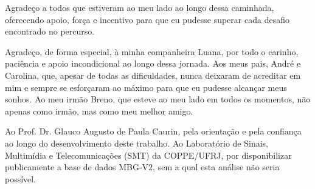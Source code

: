 \begin{agradecimentos}
Agradeço a todos que estiveram ao meu lado ao longo dessa caminhada, oferecendo apoio, força e incentivo para que eu pudesse superar cada desafio encontrado no percurso.

Agradeço, de forma especial, à minha companheira Luana, por todo o carinho, paciência e apoio incondicional ao longo dessa jornada. Aos meus pais, André e Carolina, que, apesar de todas as dificuldades, nunca deixaram de acreditar em mim e sempre se esforçaram ao máximo para que eu pudesse alcançar meus sonhos. Ao meu irmão Breno, que esteve ao meu lado em todos os momentos, não apenas como irmão, mas como meu melhor amigo.

Ao Prof. Dr. Glauco Augusto de Paula Caurin, pela orientação e pela confiança ao longo do desenvolvimento deste trabalho. Ao Laboratório de Sinais, Multimídia e Telecomunicações (SMT) da COPPE/UFRJ, por disponibilizar publicamente a base de dados MBG-V2, sem a qual esta análise não seria possível.

\end{agradecimentos}
